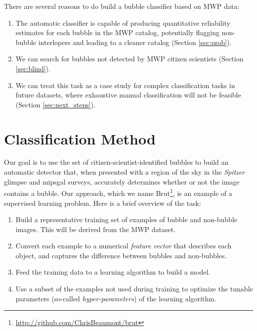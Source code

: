 \documentclass[preprint]{aastex}
\begin{document}
There are several reasons to do build a bubble classifier based on MWP data:

\begin{enumerate}
\item The automatic classifier is capable of producing quantitative reliability estimates for each bubble in the MWP catalog, potentially flagging non-bubble interlopers and leading to a cleaner catalog (Section \ref{sec:prob}).

\item We can search for bubbles not detected by MWP citizen scientists (Section \ref{sec:blind}). 

\item We can treat this task as a case study for complex classification tasks in future datasets, where exhaustive manual classification will not be feasible (Section \ref{sec:next_steps}).
\end{enumerate}

\section{Classification Method}
\label{sec:method}

Our goal is to use the set of citizen-scientist-identified bubbles to build an automatic detector that, when presented with a region of the sky in the  \textit{Spitzer} {\sc glimpse} and {\sc mipsgal} surveys, accurately determines whether or not the image contains a bubble. Our approach, which we name Brut\footnote{\url{http://github.com/ChrisBeaumont/brut}}, is an example of a supervised learning problem. Here is a brief overview of the task:

\begin{enumerate}
\item Build a representative training set of examples of bubble and non-bubble images. This will be derived from the MWP dataset.
\item Convert each example to a numerical \textit{feature vector} that describes each object, and captures the difference between bubbles and non-bubbles.
\item Feed the training data to a learning algorithm to build a model.
\item Use a subset of the examples not used during training to optimize the tunable parameters (so-called \textit{hyper-parameters}) of the learning algorithm.
\end{enumerate}
\end{document}

